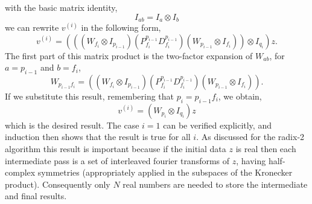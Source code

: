 \documentclass[fleqn,12pt]{article}
\begin{document}
with the basic matrix identity,
%
\begin{equation}
I_{ab} = I_a \otimes I_b
\end{equation}
%
we can rewrite $v^{(i)}$ in the following form,
%
\begin{equation}
v^{(i)} =  (((W_{f_i} \otimes I_{p_{i-1}}) 
                (P^{p_{i-1}}_{f_i} D^{p_{i-1}}_{f_i})
                (W_{p_{i-1}} \otimes I_{f_i})) \otimes I_{q_i}) z .
\end{equation}
%
The first part of this matrix product is the two-factor expansion of
$W_{ab}$, for $a = p_{i-1}$ and $b = f_i$,
%
\begin{equation}
W_{p_{i-1} f_i} = ((W_{f_i} \otimes I_{p_{i-1}}) 
                  (P^{p_{i-1}}_{f_i} D^{p_{i-1}}_{f_i})
                  (W_{p_{i-1}} \otimes I_{f_i})).
\end{equation}
%
If we substitute this result, remembering that $p_i = p_{i-1} f_i$, we
obtain,
%
\begin{equation}
v^{(i)} = (W_{p_i} \otimes I_{q_i}) z
\end{equation}
%
which is the desired result. The case $i=1$ can be verified
explicitly, and induction then shows that the result is true for all
$i$.  As discussed for the radix-2 algorithm this result is important
because if the initial data $z$ is real then each intermediate pass is
a set of interleaved fourier transforms of $z$, having half-complex
symmetries (appropriately applied in the subspaces of the Kronecker
product). Consequently only $N$ real numbers are needed to store the
intermediate and final results.
\end{document}
